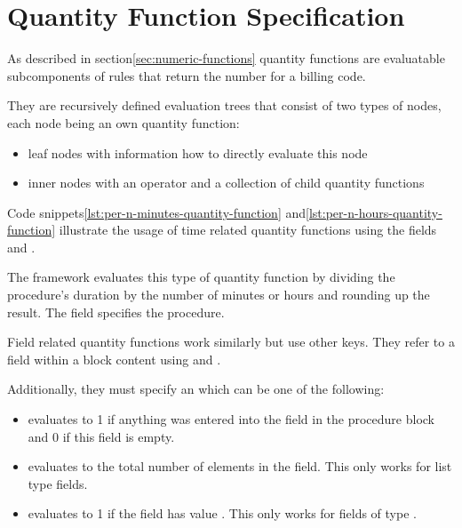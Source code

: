 \section{Quantity Function Specification}\label{sec:quantity-function-specification}


As described in section\ref{sec:numeric-functions} quantity functions are evaluatable subcomponents of rules that return
the number for a billing code.

They are recursively defined evaluation trees that consist of two types of nodes, each node being an own quantity function:
\begin{itemize}
    \item leaf nodes with information how to directly evaluate this node
    \item inner nodes with an operator and a collection of child quantity functions
\end{itemize}

Code snippets\ref{lst:per-n-minutes-quantity-function} and\ref{lst:per-n-hours-quantity-function} illustrate the usage of time related
quantity functions using the fields and .





The framework evaluates this type of quantity function by dividing the procedure's duration by the number of minutes or hours and rounding up the result.
The  field specifies the procedure.

Field related quantity functions work similarly but use other keys.
They refer to a field within a block content using  and .

Additionally, they must specify an  which can be one of the following:

\begin{itemize}
    \item {} evaluates to 1 if anything was entered into the field in the procedure block and 0 if this field is empty.
    \item {} evaluates to the total number of elements in the field.
    This only works for list type fields.
    \item {} evaluates to 1 if the field has value .
    This only works for fields of type .
\end{itemize}

